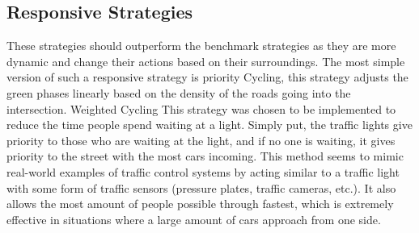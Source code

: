 \documentclass[10pt]{article}
\begin{document}
\subsection{Responsive Strategies}
These strategies should outperform the benchmark strategies as they are more dynamic and change their actions based on their surroundings. The most simple version of such a responsive strategy is priority Cycling,  this strategy adjusts the green phases linearly based on the density of the roads going into the intersection. Weighted Cycling This strategy was chosen to be implemented to reduce the time people spend waiting at a light. Simply put, the traffic lights give priority to those who are waiting at the light, and if no one is waiting, it gives priority to the street with the most cars incoming. This method seems to mimic real-world examples of traffic control systems by acting similar to a traffic light with some form of traffic sensors (pressure plates, traffic cameras, etc.). It also allows the most amount of people possible through fastest, which is extremely effective in situations where a large amount of cars approach from one side. 
\end{document}
